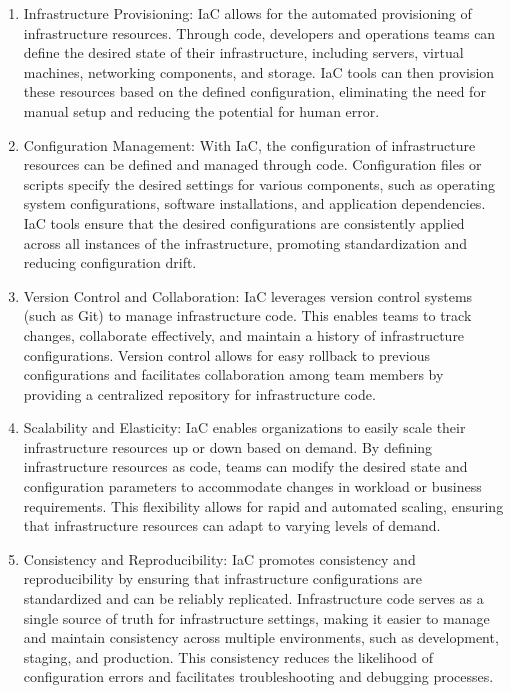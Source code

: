 \begin{enumerate}
    \item Infrastructure Provisioning: IaC allows for the automated provisioning of infrastructure resources. Through code, developers and operations teams can define the desired state of their infrastructure, including servers, virtual machines, networking components, and storage. IaC tools can then provision these resources based on the defined configuration, eliminating the need for manual setup and reducing the potential for human error.

    \item Configuration Management: With IaC, the configuration of infrastructure resources can be defined and managed through code. Configuration files or scripts specify the desired settings for various components, such as operating system configurations, software installations, and application dependencies. IaC tools ensure that the desired configurations are consistently applied across all instances of the infrastructure, promoting standardization and reducing configuration drift.

    \item Version Control and Collaboration: IaC leverages version control systems (such as Git) to manage infrastructure code. This enables teams to track changes, collaborate effectively, and maintain a history of infrastructure configurations. Version control allows for easy rollback to previous configurations and facilitates collaboration among team members by providing a centralized repository for infrastructure code.

    \item Scalability and Elasticity: IaC enables organizations to easily scale their infrastructure resources up or down based on demand. By defining infrastructure resources as code, teams can modify the desired state and configuration parameters to accommodate changes in workload or business requirements. This flexibility allows for rapid and automated scaling, ensuring that infrastructure resources can adapt to varying levels of demand.

    \item Consistency and Reproducibility: IaC promotes consistency and reproducibility by ensuring that infrastructure configurations are standardized and can be reliably replicated. Infrastructure code serves as a single source of truth for infrastructure settings, making it easier to manage and maintain consistency across multiple environments, such as development, staging, and production. This consistency reduces the likelihood of configuration errors and facilitates troubleshooting and debugging processes.


\end{enumerate}
